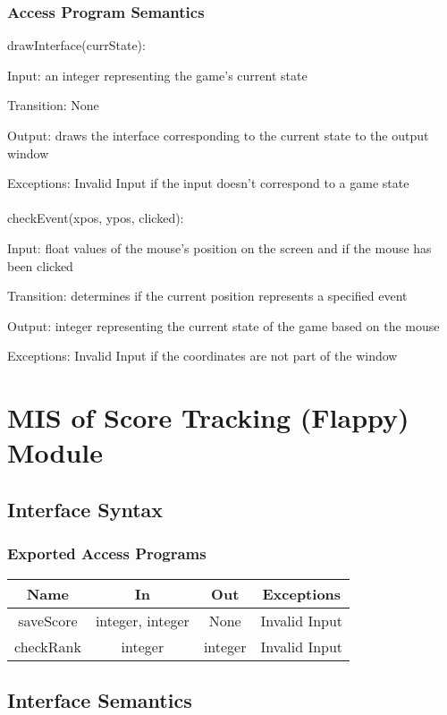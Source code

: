 \documentclass[12pt, titlepage]{article}
\begin{document}
		\subsubsection{Access Program Semantics}
		drawInterface(currState):
		
		Input: an integer representing the game's current state
		
		Transition: None
		
		Output: draws the interface corresponding to the current state to the output window
		
		Exceptions: Invalid Input if the input doesn't correspond to a game state\\
		\\
		checkEvent(xpos, ypos, clicked):
		
		Input: float values of the mouse's position on the screen and if the mouse has been clicked
		
		Transition: determines if the current position represents a specified event
		
		Output: integer representing the current state of the game based on the mouse
		
		Exceptions: Invalid Input if the coordinates are not part of the window


\section{MIS of Score Tracking (Flappy) Module}
		\subsection{Interface Syntax}
		\subsubsection{Exported Access Programs}
		\begin{tabular}[pos]{|c|c|c|c|}
			\hline
			\textbf{Name}& \textbf{In} & \textbf{Out} & \textbf{Exceptions} \\ \hline
			saveScore & integer, integer & None & Invalid Input \\ \hline
			checkRank & integer & integer & Invalid Input \\ \hline
		\end{tabular}
		
		\subsection{Interface Semantics}
\end{document}
